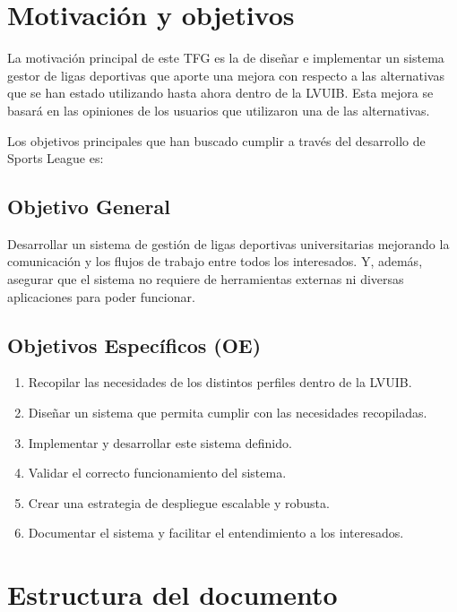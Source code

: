 \section{Motivación y objetivos}

La motivación principal de este \ac{TFG} es la de diseñar e implementar un sistema gestor de ligas deportivas que aporte una mejora con respecto a las alternativas que se han estado utilizando hasta ahora dentro de la \ac{LVUIB}. Esta mejora se basará en las opiniones de los usuarios que utilizaron una de las alternativas. 

Los objetivos principales que han buscado cumplir a través del desarrollo de Sports League es:

\subsection*{Objetivo General}

Desarrollar un sistema de gestión de ligas deportivas universitarias mejorando la comunicación y los flujos de trabajo entre todos los interesados. Y, además, asegurar que el sistema no requiere de herramientas externas ni diversas aplicaciones para poder funcionar.

\subsection*{Objetivos Específicos (OE)}
\label{sec:oe}

\begin{enumerate}[label=\textbf{OE\arabic*},leftmargin=*]
    \item Recopilar las necesidades de los distintos perfiles dentro de la \ac{LVUIB}.
    \item Diseñar un sistema que permita cumplir con las necesidades recopiladas.
    \item Implementar y desarrollar este sistema definido.
    \item Validar el correcto funcionamiento del sistema.
    \item Crear una estrategia de despliegue escalable y robusta.
    \item Documentar el sistema y facilitar el entendimiento a los interesados.
\end{enumerate}

\section{Estructura del documento}

